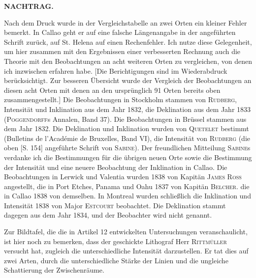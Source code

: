 \begin{center}\large\bfseries NACHTRAG.\end{center}
Nach dem Druck wurde in der Vergleichstabelle an zwei Orten ein kleiner Fehler bemerkt. In Callao geht er auf eine falsche Längenangabe in der angeführten Schrift zurück, auf St. Helena auf einen Rechenfehler. Ich nutze diese Gelegenheit, um hier zusammen mit den Ergebnissen einer verbesserten Rechnung auch die Theorie mit den Beobachtungen an acht weiteren Orten zu vergleichen, von denen ich inzwischen erfahren habe. [Die Berichtigungen sind im Wiederabdruck berücksichtigt. Zur besseren Übersicht wurde der Vergleich der Beobachtungen an diesen acht Orten mit denen an den ursprünglich 91 Orten bereits oben zusammengestellt.]
Die Beobachtungen in Stockholm stammen von \textsc{Rudberg}, Intensität und Inklination aus dem Jahr 1832, die Deklination aus dem Jahr 1833 (\textsc{Poggendorff}s Annalen, Band 37). Die Beobachtungen in Brüssel stammen aus dem Jahr 1832. Die Deklination und Inklination wurden von \textsc{Quetelet} bestimmt (Bulletins de l’Académie de Bruxelles, Band VI), die Intensität von \textsc{Rudberg} (die oben [S. 154] angeführte Schrift von \textsc{Sabine}). Der freundlichen Mitteilung \textsc{Sabine}s verdanke ich die Bestimmungen für die übrigen neuen Orte sowie die Bestimmung der Intensität und eine neuere Beobachtung der Inklination in Callao. Die Beobachtungen in Lerwick und Valentia wurden 1838 von Kapitän \textsc{James Ross} angestellt, die in Port Etches, Panama und Oahu 1837 von Kapitän \textsc{Belcher}. die in Callao 1838 von demselben. In Montreal wurden schließlich die Inklination und Intensität 1838 von Major \textsc{Estcourt} beobachtet. Die Deklination stammt dagegen aus dem Jahr 1834, und der Beobachter wird nicht genannt.

Zur Bildtafel, die die in Artikel 12 entwickelten Untersuchungen veranschaulicht, ist hier noch zu bemerken, dass der geschickte Lithograf Herr \textsc{Rittmüller} versucht hat, zugleich die unterschiedliche Intensität darzustellen. Er tat dies auf zwei Arten, durch die unterschiedliche Stärke der Linien und die ungleiche Schattierung der Zwischenräume.

